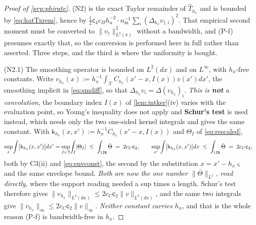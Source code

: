 \begin{proof}[Proof of \cref{prp:phirate}]
(N2) is the exact Taylor remainder of
$\hat T_{h_x}$ and is bounded by \eqref{eq:hatTxrem}, hence by
$\tfrac12\mathsf c_4c_\Pi h_u^{-2}\cdot n_{\mathrm m}^{-1}\sum_{i}(\Delta_{h_x}v_{\dagger,i})^{2}$.
That empirical second moment must be converted to $\|v_\dagger\|^{2}_{L^{2}(\pi)}$ without a
bandwidth, and (P-f) presumes exactly that, so the conversion is performed here in full rather than
asserted. Three steps, and the third is where the uniformity is bought.

(N2.1) The smoothing operator is bounded on $L^{2}(dx)$ and on $L^{\infty}$, with $h_x$-free
constants. Write $v_{h_x}(x):=h_x^{-1}\!\int_{\mathcal X}C_{h_x}(x'-x,I(x))v(x')dx'$, the smoothing
implicit in \eqref{eq:smdiff}, so that $\Delta_{h_x}v_i=\Delta(v_{h_x})_i$. \emph{This is \textbf{not} a
convolution}, the boundary index $I(x)$ of \cref{lem:intker}(iv) varies with the evaluation point, 
so Young's inequality does not apply and \textbf{Schur's test} is used instead, which needs only the two
one-sided kernel integrals and gives the same constant. With
$\mathsf k_{h_x}(x,x'):=h_x^{-1}C_{h_x}(x'-x,I(x))$ and $\Theta_{I}$ of \eqref{eq:rescaled},
\[
\sup_x\!\int\!\big|\mathsf k_{h_x}(x,x')\big|dx'
=\sup_{I\in\mathfrak I}\!\int_{I}\!|\Theta_{I}|
\;\le\;\int_\IR\bar\Theta\;=\;2c_C\mathsf c_2,
\qquad
\sup_{x'}\!\int\!\big|\mathsf k_{h_x}(x,x')\big|dx\;\le\;\int_\IR\bar\Theta\;=\;2c_C\mathsf c_2 ,
\]
both by C3(ii) and \eqref{eq:envconst}, the second by the substitution $x=x'-h_x\varsigma$ and the same
envelope bound. \emph{Both are now the one number $\|\bar\Theta\|_{L^{1}}$, read directly}, where the
support reading needed a sup times a length.
Schur's test
therefore gives $\|v_{h_x}\|_{L^{2}(dx)}\le2c_C\mathsf c_2\|v\|_{L^{2}(dx)}$, and the same two integrals
give $\|v_{h_x}\|_\infty\le2c_C\mathsf c_2\|v\|_\infty$. \emph{Neither constant carries $h_x$}, and that
is the whole reason (P-f) is bandwidth-free in $h_x$.


\end{proof}
